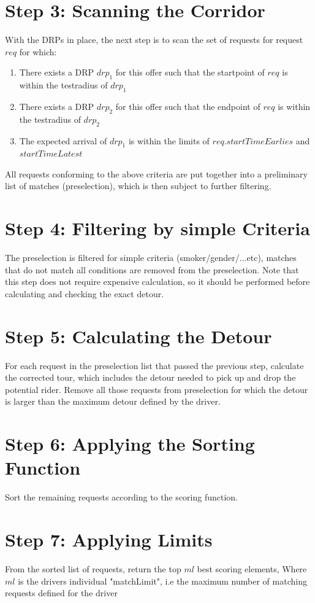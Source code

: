 \section{Step 3: Scanning the Corridor}
With the DRPs in place, the next step is to scan the set of requests for request $req$ for which:

\begin{enumerate}
\item{There exists a DRP $drp_1$ for this offer such that the startpoint of $req$ is within the testradius of $drp_1$ }
\item{There exists a DRP $drp_2$ for this offer such that the endpoint of $req$ is within the testradius of $drp_2$}
\item{The expected arrival of $drp_1$ is within the limits of $req.startTimeEarlies$ and $startTimeLatest$}
\end{enumerate}
All requests conforming to the above criteria are put together into a preliminary 
list of matches (preselection), which is then subject to further filtering.
\section{Step 4: Filtering by simple Criteria}
\label{sfrFilteringSimpleCriteria}
The preselection is filtered for simple criteria (smoker/gender/...etc), matches that do not 
match all conditions are removed from the preselection.
Note that this step does not require expensive calculation, so it should be performed before
calculating and checking the exact detour.
\section{Step 5: Calculating the Detour}
\label{sfrCalculatingDetour}
For each request in the preselection list that passed the previous step, calculate the corrected tour, 
which includes the detour needed to pick up and drop the potential rider.
Remove all those requests from preselection for which the detour is larger than the maximum detour defined by the driver. 	
      
\section{Step 6: Applying the Sorting Function}
\label{sfrSortingFunction}
Sort the remaining requests according to the scoring function.

\section{Step 7: Applying Limits}
\label{sfrApplyingLimits}
From the sorted list of requests, return the top $ml$ best scoring elements,
Where $ml$ is the drivers individual "matchLimit", i.e the maximum number of 
matching requests defined for the driver
      
	
